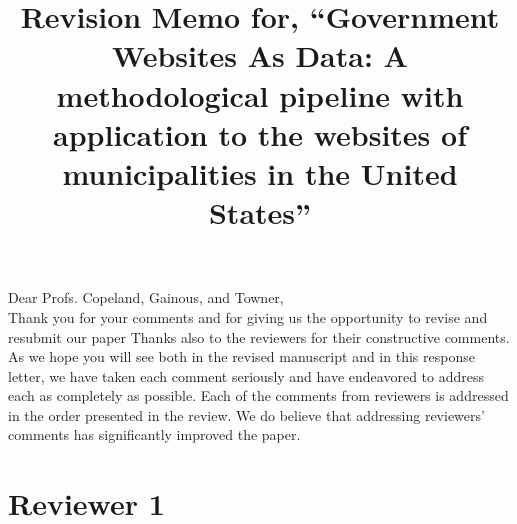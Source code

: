 \documentclass[12pt,titlepage]{article}
\title{Revision Memo for, ``Government Websites As Data: A methodological pipeline with application to the websites of municipalities in the United States''}
\begin{document}
\maketitle

Dear Profs. Copeland, Gainous, and Towner,\\

Thank you for your comments and for giving us the opportunity to revise and resubmit our paper Thanks also to the reviewers for their constructive comments. As we hope you will see both in the revised manuscript and in this response letter, we have taken each comment seriously and have endeavored to address each as completely as possible. Each of the comments from reviewers is addressed in the order presented in the review. We do believe that addressing reviewers' comments has significantly improved the paper. \\

\section*{Reviewer 1}
\end{document}
